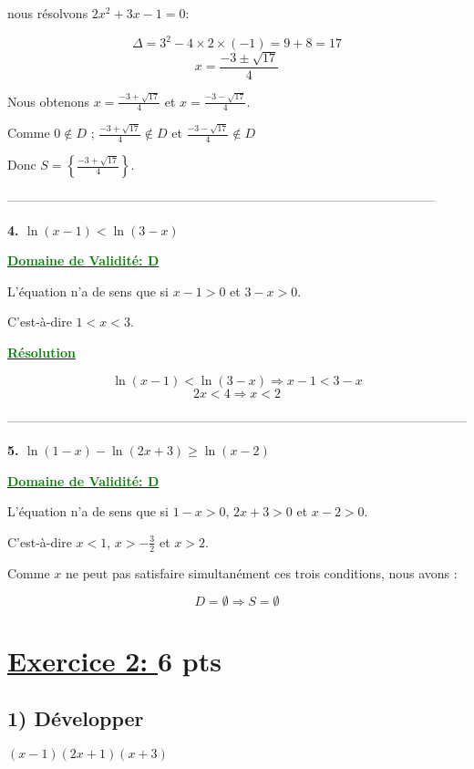 \documentclass[12pt]{article}
\begin{document}
nous résolvons \(2x^2 + 3x - 1 = 0\):

\[
\Delta = 3^2 - 4 \times 2 \times (-1) = 9 + 8 = 17
\]
\[
x = \frac{-3 \pm \sqrt{17}}{4}
\]

Nous obtenons \(x = \frac{-3 + \sqrt{17}}{4}\) et \(x = \frac{-3 - \sqrt{17}}{4}\).

Comme \(0 \notin D\) ; \(\frac{-3 + \sqrt{17}}{4} \notin D\) et \(\frac{-3 - \sqrt{17}}{4} \notin D\)  

Donc \(S = \left\{\frac{-3 + \sqrt{17}}{4}\right\}\).

\textcolor{green}{}

-----------------------------------------------------------------------------------------------------

\textbf{4. \(\ln(x-1)<\ln(3-x)\)}

\textbf{\underline{\textcolor{green}{Domaine de Validité: D}}}

L'équation n'a de sens que si \(x-1>0\) et \(3-x>0\).

C'est-à-dire \(1<x<3\).

\textbf{\underline{\textcolor{green}{Résolution}}}

\[
\ln(x-1)<\ln(3-x)\Longrightarrow x-1<3-x
\]
\[
2x<4\Longrightarrow x<2
\]

\textcolor{green}{\boxed{S=]1,2[}}

------------------------------------------------------------------------------------------------------------

\textbf{5. \(\ln(1-x)-\ln(2x+3)\geq\ln(x-2)\)}

\textbf{\underline{\textcolor{green}{Domaine de Validité: D}}}

L'équation n'a de sens que si \(1-x>0\), \(2x+3>0\) et \(x-2>0\).

C'est-à-dire \(x<1\), \(x>-\frac{3}{2}\) et \(x>2\).

Comme \(x\) ne peut pas satisfaire simultanément ces trois conditions, nous avons :

\[
D = \emptyset \Longrightarrow S = \emptyset
\]

\section*{\underline{Exercice 2: }\textbf{6 pts}}
\subsection*{ 1) Développer } $(x-1)(2x+1)(x+3)$
\end{document}
